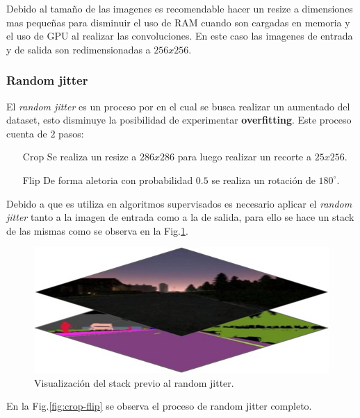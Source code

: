 \documentclass[]{IEEEtran}
\begin{document}
    Debido al tamaño de las imagenes es recomendable hacer un resize a dimensiones mas pequeñas 
    para disminuir el uso de RAM cuando son cargadas en memoria y el uso de GPU al realizar las convoluciones. En 
    este caso las imagenes de entrada y de salida son redimensionadas a $256x256$.

    \subsubsection{Random jitter}

    El \textit{random jitter} es un proceso por en el cual se busca realizar un aumentado
    del dataset, esto disminuye la posibilidad de experimentar \textbf{overfitting}. 
    Este proceso cuenta de $2$ pasos:

    \begin{itemize}
        \item[Crop] Se realiza un resize a $286x286$ para luego realizar un recorte a $25x256$.
        \item[Flip] De forma aletoria con probabilidad $0.5$ se realiza un rotación de $180^\circ$. 
    \end{itemize}

    Debido a que es utiliza en algoritmos supervisados es necesario aplicar 
    el \textit{random jitter} tanto a la imagen de entrada como a la de salida,
    para ello se hace un stack de las mismas como se observa en la Fig.\ref{fig:random-jitter}.

    \begin{figure}
        \centering
        \includegraphics[width=.4\textwidth]{Imgs/stack-random-jitter.jpeg}
        \caption{Visualización del stack previo al random jitter.}
        \label{fig:random-jitter}
    \end{figure}

    En la Fig.\ref{fig:crop-flip} se observa el proceso de random jitter completo.
\end{document}
